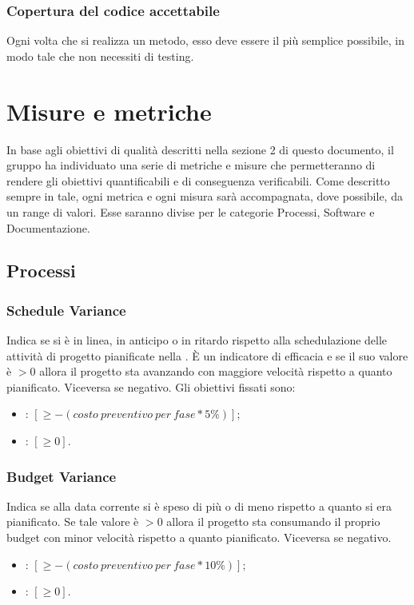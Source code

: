\subsubsection{Copertura del codice accettabile}
Ogni volta che si realizza un metodo, esso deve essere il più semplice possibile, in modo tale che non necessiti di testing.

\newpage

\section{Misure e metriche}
In base agli obiettivi di qualità descritti nella sezione 2 di questo documento, il gruppo ha individuato una serie di metriche e misure che permetteranno di rendere gli obiettivi quantificabili e di conseguenza verificabili. Come descritto sempre in tale, ogni metrica e ogni misura sarà accompagnata, dove possibile, da un range di valori. Esse saranno divise per le categorie Processi, Software e Documentazione. 

\subsection{Processi}
\subsubsection{Schedule Variance}
Indica se si è in linea, in anticipo o in ritardo rispetto alla schedulazione delle attività di progetto pianificate nella . È un indicatore di efficacia e se il suo valore è $> 0$ allora il progetto sta avanzando con maggiore velocità rispetto a quanto pianificato. Viceversa se negativo.
Gli obiettivi fissati sono:
\begin{itemize}
\item {}: $ [\geq -(costo\:preventivo\:per\:fase * 5\%)]; $
\item {}: $ [\geq 0]. $
\end{itemize}

\subsubsection{Budget Variance}
Indica se alla data corrente si è speso di più o di meno rispetto a quanto si era pianificato. Se tale valore è $>0$ allora il progetto sta consumando il proprio budget con minor velocità rispetto a quanto pianificato. Viceversa se negativo.
\begin{itemize}
\item {}: $[\geq -(costo\:preventivo\:per\:fase * 10\%)];$
\item {}: $[\geq 0].$
\end{itemize}

